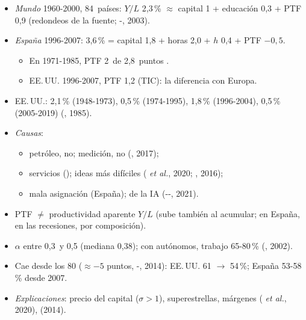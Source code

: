 \documentclass{article}
\begin{document}
\begin{columnas}
\begin{itemize}
\item \emph{Mundo} 1960-2000, 84~países: $Y/L$ 2,3\,\% $\approx$ capital 1 + educación 0,3 + PTF 0,9 (redondeos de la fuente; -, 2003).
\item \emph{España} 1996-2007: 3,6\,\% = capital 1,8 + horas 2,0 + $h$ 0,4 + PTF $-0{,}5$.
  \begin{itemize}
  \item En 1971-1985, PTF 2~de 2,8~puntos .
  \item EE.\,UU. 1996-2007, PTF 1,2 (TIC): la diferencia con Europa.
  \end{itemize}
\end{itemize}
\begin{itemize}
\item EE.\,UU.: 2,1\,\% (1948-1973), 0,5\,\% (1974-1995), 1,8\,\% (1996-2004), 0,5\,\% (2005-2019) (, 1985).
\item \emph{Causas}:
  \begin{itemize}
  \item petróleo, no; medición, no (, 2017);
  \item servicios (); ideas más difíciles ( \emph{et al.}, 2020; , 2016);
  \item mala asignación (España);  de la IA (--, 2021).
  \end{itemize}
\item PTF $\neq$ productividad aparente $Y/L$ (sube también al acumular; en España, en las recesiones, por composición).
\end{itemize}
\begin{itemize}
\item $\alpha$ entre 0,3~y 0,5 (mediana 0,38); con autónomos, trabajo 65-80\,\% (, 2002).
\item Cae desde los 80 ($\approx-5$ puntos, -, 2014): EE.\,UU. 61 $\to$ 54\,\%; España 53-58\,\% desde 2007.
\item \emph{Explicaciones}: precio del capital ($\sigma>1$), superestrellas, márgenes ( \emph{et al.}, 2020),  (2014).
\end{itemize}


\end{columnas}
\end{document}
